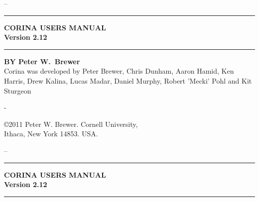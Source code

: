 
\begin{titlepage}
\AddToShipoutPicture*{\BackgroundPic}

{ --\\[4cm] 
\hrule 
\vspace{5mm}
\Huge \bfseries CORINA USERS MANUAL
\\[0.5cm]
\large{Version 2.12}
\vspace{5mm}
\hrule
\vspace{3cm}

}

{
\normalsize
\textbf{BY Peter W.\ Brewer}\\[0.6cm]

Corina was developed by Peter Brewer, Chris Dunham, Aaron Hamid, Ken Harris, Drew Kalina, Lucas Madar, Daniel Murphy, Robert 'Mecki' Pohl and Kit Sturgeon

}

\vfill

{\footnotesize

}

\end{titlepage}

\thispagestyle{empty} 
-
\vfill
\parbox[b]{8cm}{\copyright 2011 Peter W. Brewer.  Cornell University, \\ Ithaca, New York 14853. USA.}

\newpage
{}
\setcounter{page}{1}
\thispagestyle{empty} 
{ --\\[4cm] 
\hrule 
\vspace{5mm}
\Huge \bfseries CORINA USERS MANUAL
\\[0.5cm]
\large{Version 2.12}
\vspace{5mm}
\hrule
\vspace{3cm}

}

\newpage


\tableofcontents


\clearpage
{} 
